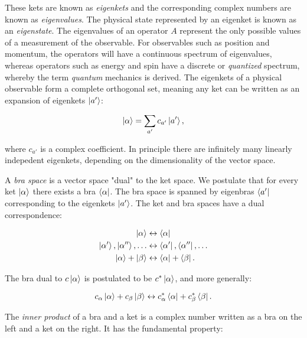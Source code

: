 These kets are known as \textit{eigenkets} and the corresponding
complex numbers are known as \textit{eigenvalues}.
The physical state represented by an eigenket is known
as an \textit{eigenstate}.
The eigenvalues of an operator $A$ represent
the only possible values of a measurement of the observable.
For observables such as position and momentum, the operators
will have a continuous spectrum of eigenvalues, whereas
operators such as energy and spin have a discrete or
\textit{quantized} spectrum, whereby the term
\textit{quantum} mechanics is derived.
The eigenkets of a physical observable form
a complete orthogonal set, meaning any ket
can be written as an expansion of eigenkets $\ket{a'}$:

\begin{equation}
\ket{\alpha} = \sum_{a'} c_{a'} \ket{a'} ,
\end{equation}

where $c_{a'}$ is a complex coefficient.
In principle there are infinitely many linearly indepedent eigenkets,
depending on the dimensionality of the vector space.
\par
A \textit{bra space} is a vector space "dual" to the ket space.
We postulate that for every ket $\ket{\alpha}$ there exists a bra
$\bra{\alpha}$. The bra space is spanned by eigenbras $\bra{a'}$
corresponding to the eigenkets $\ket{a'}$. The ket and bra spaces
have a dual correspondence:

\begin{equation}
\begin{split}
\ket{\alpha} &\leftrightarrow \bra{\alpha} \\
\ket{\alpha '}, \ket{\alpha ''},\dots &\leftrightarrow \bra{\alpha '}, 
    \bra{\alpha ''},\dots \\
\ket{\alpha} + \ket{\beta} &\leftrightarrow \bra{\alpha} + \bra{\beta} .
\end{split}
\end{equation}

The bra dual to $c \ket{\alpha}$ is postulated to be $c^* \ket{\alpha}$,
and more generally:

\begin{equation}
c_{\alpha} \ket{\alpha} + c_{\beta} \ket{\beta} \leftrightarrow
c_{\alpha}^* \bra{\alpha} + c_{\beta}^* \bra{\beta} .
\end{equation}

The \textit{inner product} of a bra and a ket is a complex number
written as a bra on the left and a ket on the right.
It has the fundamental property:

